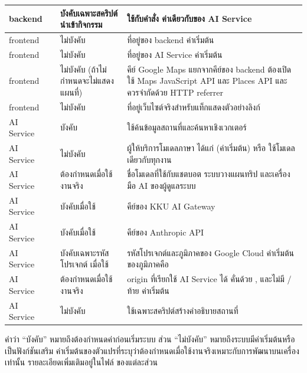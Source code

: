 {\begin{longtable}{|L{1.9cm}|L{4.5cm}|L{2.2cm}|L{\dimexpr\linewidth-8.6cm-8\arrayrulewidth\relax}|}
backend & \newline{} & บังคับเฉพาะสคริปต์นำเข้ากิจกรรม & ใช้กับคำสั่ง  ค่าเดียวกับของ AI Service \\ \hline
frontend &  & ไม่บังคับ & ที่อยู่ของ backend ค่าเริ่มต้น  \\ \hline
frontend &  & ไม่บังคับ & ที่อยู่ของ AI Service ค่าเริ่มต้น  \\ \hline
frontend &  & ไม่บังคับ (ถ้าไม่กำหนดจะไม่แสดงแผนที่) & คีย์ Google Maps แยกจากคีย์ของ backend ต้องเปิดใช้ Maps JavaScript API และ Places API และควรจำกัดด้วย HTTP referrer \\ \hline
frontend &  & ไม่บังคับ & ที่อยู่เว็บไซต์จริงสำหรับแท็กแสดงตัวอย่างลิงก์ \\ \hline
AI Service & \newline{} & บังคับ & ใช้ค้นข้อมูลสถานที่และค้นหาเชิงเวกเตอร์ \\ \hline
AI Service &  & ไม่บังคับ & ผู้ให้บริการโมเดลภาษา ได้แก่  (ค่าเริ่มต้น)  หรือ  ใช้โมเดลเดียวกับทุกงาน \\ \hline
AI Service &  & ต้องกำหนดเมื่อใช้งานจริง & ชื่อโมเดลที่ใช้กับแชตบอต ระบบวางแผนทริป และเครื่องมือ AI ของผู้ดูแลระบบ \\ \hline
AI Service &  & บังคับเมื่อใช้  & คีย์ของ KKU AI Gateway \\ \hline
AI Service &  & บังคับเมื่อใช้  & คีย์ของ Anthropic API \\ \hline
AI Service & \newline{} & บังคับเฉพาะรหัสโปรเจกต์ เมื่อใช้  & รหัสโปรเจกต์และภูมิภาคของ Google Cloud ค่าเริ่มต้นของภูมิภาคคือ  \\ \hline
AI Service &  & ต้องกำหนดเมื่อใช้งานจริง & origin ที่เรียกใช้ AI Service ได้ คั่นด้วย , และไม่มี / ท้าย ค่าเริ่มต้น  \\ \hline
AI Service &  & ไม่บังคับ & ใช้เฉพาะสคริปต์สร้างคำอธิบายสถานที่ \\ \hline
\end{longtable}
}

คำว่า ``บังคับ'' หมายถึงต้องกำหนดค่าก่อนเริ่มระบบ ส่วน ``ไม่บังคับ'' หมายถึงระบบมีค่าเริ่มต้นหรือเป็นฟังก์ชันเสริม ค่าเริ่มต้นของตัวแปรที่ระบุว่าต้องกำหนดเมื่อใช้งานจริงเหมาะกับการพัฒนาบนเครื่องเท่านั้น รายละเอียดเพิ่มเติมอยู่ในไฟล์  ของแต่ละส่วน

